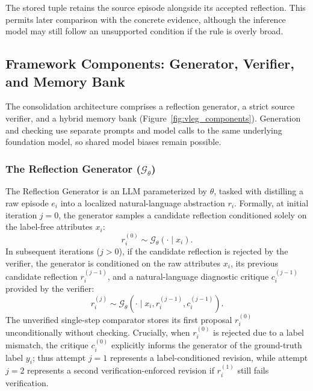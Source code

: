 \documentclass[10pt,a4paper,onecolumn]{article}
\theoremstyle{definition}
\theoremstyle{remark}
\begin{document}
The stored tuple retains the source episode alongside its accepted reflection. This permits later comparison with the concrete evidence, although the inference model may still follow an unsupported condition if the rule is overly broad.

\subsection{Framework Components: Generator, Verifier, and Memory Bank}
The consolidation architecture comprises a reflection generator, a strict source verifier, and a hybrid memory bank (Figure~\ref{fig:vleg_components}). Generation and checking use separate prompts and model calls to the same underlying foundation model, so shared model biases remain possible.

\subsubsection{The Reflection Generator (\texorpdfstring{$\mathcal{G}_\theta$}{G\_theta})}
The Reflection Generator is an LLM parameterized by $\theta$, tasked with distilling a raw episode $e_i$ into a localized natural-language abstraction $r_i$. Formally, at initial iteration $j=0$, the generator samples a candidate reflection conditioned solely on the label-free attributes $x_i$:
\begin{equation}
    r_i^{(0)} \sim \mathcal{G}_\theta(\cdot \mid x_i).
    \label{eq:gen0}
\end{equation}
In subsequent iterations ($j > 0$), if the candidate reflection is rejected by the verifier, the generator is conditioned on the raw attributes $x_i$, its previous candidate reflection $r_i^{(j-1)}$, and a natural-language diagnostic critique $c_i^{(j-1)}$ provided by the verifier:
\begin{equation}
    r_i^{(j)} \sim \mathcal{G}_\theta(\cdot \mid x_i, r_i^{(j-1)}, c_i^{(j-1)}).
    \label{eq:genj}
\end{equation}
The unverified single-step comparator stores its first proposal $r_i^{(0)}$ unconditionally without checking. Crucially, when $r_i^{(0)}$ is rejected due to a label mismatch, the critique $c_i^{(0)}$ explicitly informs the generator of the ground-truth label $y_i$; thus attempt $j=1$ represents a label-conditioned revision, while attempt $j=2$ represents a second verification-enforced revision if $r_i^{(1)}$ still fails verification.
\end{document}
